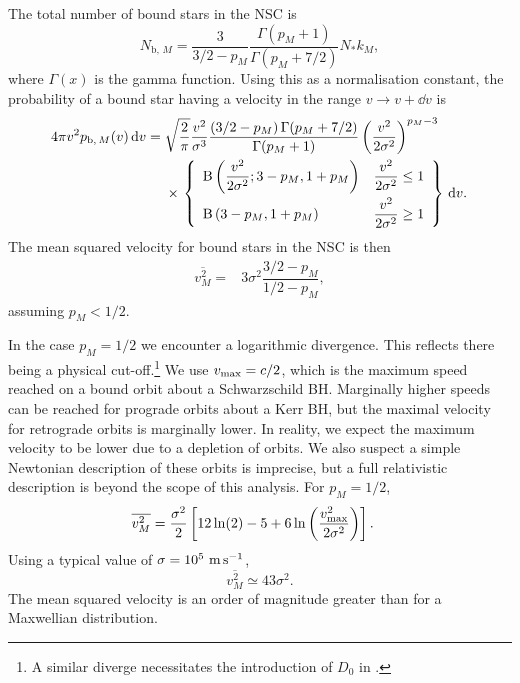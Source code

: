 The total number of bound stars in the NSC is
\begin{equation}
N_{\mathrm{b},\,M} = \dfrac{3}{3/2 - p_M}\dfrac{\Gamma(p_M + 1)}{\Gamma(p_M + 7/2)}N_\ast k_M,
\end{equation}
where $\Gamma(x)$ is the gamma function. Using this as a normalisation constant, the probability of a bound star having a velocity in the range $v \rightarrow v + \dd v$ is
\begin{align}
4\pi v^2 p_{\mathrm{b},\,M}(v) \,\dd v = {} & \sqrt{\dfrac{2}{\pi}} \dfrac{v^2}{\sigma^3} \dfrac{\left(3/2 - p_M\right)\Gamma(p_M + 7/2)}{\Gamma(p_M + 1)} \left(\dfrac{v^2}{2\sigma^2}\right)^{p_M - 3} \nonumber \\* 
 {} & \times \left. \left\{\begin{array}{lr}
\Beta\left(\dfrac{v^2}{2\sigma^2}; 3 - p_M, 1 + p_M\right) \vspace{1mm} & \dfrac{v^2}{2\sigma^2} \leq 1 \\
\Beta\left(3 - p_M, 1 + p_M\right) & \dfrac{v^2}{2\sigma^2} \geq 1\end{array}\right\}\,\dd v. \right.
\end{align}
The mean squared velocity for bound stars in the NSC is then
\begin{align}
\overline{v^2_{M}} = {} & 3\sigma^2\dfrac{3/2 - p_M}{1/2 - p_M},
\end{align}
assuming $p_M < 1/2$.

In the case $p_M = 1/2$ we encounter a logarithmic divergence. This reflects there being a physical cut-off.\footnote{A similar diverge necessitates the introduction of $D_0$ in .} We use $v_\mathrm{max} = c/2$, which is the maximum speed reached on a bound orbit about a Schwarzschild BH. Marginally higher speeds can be reached for prograde orbits about a Kerr BH, but the maximal velocity for retrograde orbits is marginally lower. In reality, we expect the maximum velocity to be lower due to a depletion of orbits. We also suspect a simple Newtonian description of these orbits is imprecise, but a full relativistic description is beyond the scope of this analysis. For $p_M = 1/2$,
\begin{align}
\overline{v^2_{M}} = {} & \dfrac{\sigma^2}{2}\left[12\ln(2) - 5 + 6 \ln\left(\dfrac{v_\mathrm{max}^2}{2\sigma^2}\right)\right].
\end{align}
Using a typical value of $\sigma = 10^5~\mathrm{m\,s^{-1}}$,
\begin{equation}
\overline{v^2_{M}} \simeq 43\sigma^2.
\end{equation}
The mean squared velocity is an order of magnitude greater than for a Maxwellian distribution.

